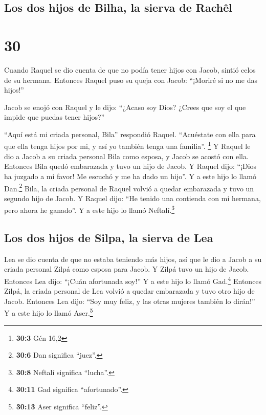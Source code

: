 \hypertarget{los-dos-hijos-de-bilha-la-sierva-de-rachuxeal}{%
\subsection{Los dos hijos de Bilha, la sierva de
Rachêl}\label{los-dos-hijos-de-bilha-la-sierva-de-rachuxeal}}

\hypertarget{section-29}{%
\section{30}\label{section-29}}

 Cuando Raquel se dio cuenta de que no podía tener hijos
con Jacob, sintió celos de su hermana. Entonces Raquel puso su queja con
Jacob: ``¡Moriré si no me das hijos!''

 Jacob se enojó con Raquel y le dijo: ``¿Acaso soy Dios?
¿Crees que soy el que impide que puedas tener hijos?''

 ``Aquí está mi criada personal, Bila'' respondió Raquel.
``Acuéstate con ella para que ella tenga hijos por mi, y así yo también
tenga una familia''. \footnote{\textbf{30:3} Gén 16,2}  Y
Raquel le dio a Jacob a su criada personal Bila como esposa, y Jacob se
acostó con ella.  Entonces Bila quedó embarazada y tuvo un
hijo de Jacob.  Y Raquel dijo: ``¡Dios ha juzgado a mi
favor! Me escuchó y me ha dado un hijo''. Y a este hijo lo llamó
Dan.\footnote{\textbf{30:6} Dan significa ``juez''.} 
Bila, la criada personal de Raquel volvió a quedar embarazada y tuvo un
segundo hijo de Jacob.  Y Raquel dijo: ``He tenido una
contienda con mi hermana, pero ahora he ganado''. Y a este hijo lo llamó
Neftalí.\footnote{\textbf{30:8} Neftalí significa ``lucha''.}

\hypertarget{los-dos-hijos-de-silpa-la-sierva-de-lea}{%
\subsection{Los dos hijos de Silpa, la sierva de
Lea}\label{los-dos-hijos-de-silpa-la-sierva-de-lea}}

 Lea se dio cuenta de que no estaba teniendo más hijos,
así que le dio a Jacob a su criada personal Zilpá como esposa para
Jacob.  Y Zilpá tuvo un hijo de Jacob. 
Entonces Lea dijo: ``¡Cuán afortunada soy!'' Y a este hijo lo llamó
Gad.\footnote{\textbf{30:11} Gad significa ``afortunado''.}
 Entonces Zilpá, la criada personal de Lea volvió a
quedar embarazada y tuvo otro hijo de Jacob.  Entonces
Lea dijo: ``Soy muy feliz, y las otras mujeres también lo dirán!'' Y a
este hijo lo llamó Aser.\footnote{\textbf{30:13} Aser significa
  ``feliz''.}

